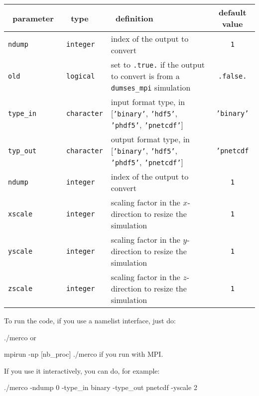 \documentclass[a4paper,12pt]{article}
\newenvironment{codeblock}[2][]{%
    \minted[bgcolor=LightGray!80!white,fontsize=\small,#1]{#2}%
}{%
    \endminted%
}%
\newenvironment{codeblock}[2][]{\verbatim}{\endverbatim}
\begin{document}
\begin{table}[h!]
  \centering
  {\footnotesize
  \begin{tabular}{l | l | p{} | c }
    ~\hfill parameter\hfill~ & ~\hfill type\hfill~ & ~\hfill definition\hfill~ & default value \\
    \hline
    \hline
    \texttt{ndump} & \texttt{integer} & index of the output to convert & \texttt{1} \\
    \texttt{old} & \texttt{logical} & set to \texttt{.true.} if the output to convert is from a \texttt{dumses\_mpi} simulation & \texttt{.false.} \\
    \texttt{type\_in} & \texttt{character} & input format type, in [\texttt{'binary'}, \texttt{'hdf5'}, \texttt{'phdf5'}, \texttt{'pnetcdf'}] & \texttt{'binary'} \\
    \texttt{typ\_out} & \texttt{character} & output format type, in [\texttt{'binary'}, \texttt{'hdf5'}, \texttt{'phdf5'}, \texttt{'pnetcdf'}] & \texttt{'pnetcdf} \\
    \texttt{ndump} & \texttt{integer} & index of the output to convert & \texttt{1} \\
    \texttt{xscale} & \texttt{integer} & scaling factor in the $x$-direction to resize the simulation & \texttt{1} \\
    \texttt{yscale} & \texttt{integer} & scaling factor in the $y$-direction to resize the simulation & \texttt{1} \\
    \texttt{zscale} & \texttt{integer} & scaling factor in the $z$-direction to resize the simulation & \texttt{1} \\
    \hline
    \end{tabular}
  }
\end{table}

To run the code, if you use a namelist interface, just do:

\begin{codeblock}{bash}
  ./merco
\end{codeblock}
or

\begin{codeblock}{bash}
  mpirun -np [nb_proc] ./merco
\end{codeblock}
if you run with MPI.

If you use it interactively, you can do, for example:

\begin{codeblock}{bash}
  ./merco -ndump 0 -type_in binary -type_out pnetcdf -yscale 2
\end{codeblock}
\end{document}
